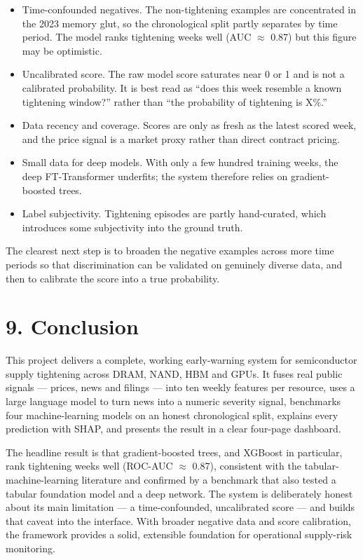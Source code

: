 \documentclass[11pt]{article}
\begin{document}
\begin{itemize}[topsep=4pt]
\item Time-confounded negatives. The non-tightening examples are concentrated in the 2023 memory glut, so the chronological split partly separates by time period. The model ranks tightening weeks well (AUC $\approx$ 0.87) but this figure may be optimistic.
\item Uncalibrated score. The raw model score saturates near 0 or 1 and is not a calibrated probability. It is best read as ``does this week resemble a known tightening window?'' rather than ``the probability of tightening is X\%.''
\item Data recency and coverage. Scores are only as fresh as the latest scored week, and the price signal is a market proxy rather than direct contract pricing.
\item Small data for deep models. With only a few hundred training weeks, the deep FT-Transformer underfits; the system therefore relies on gradient-boosted trees.
\item Label subjectivity. Tightening episodes are partly hand-curated, which introduces some subjectivity into the ground truth.
\end{itemize}

The clearest next step is to broaden the negative examples across more time periods so that discrimination can be validated on genuinely diverse data, and then to calibrate the score into a true probability.

\section{9. Conclusion}

This project delivers a complete, working early-warning system for semiconductor supply tightening across DRAM, NAND, HBM and GPUs. It fuses real public signals --- prices, news and filings --- into ten weekly features per resource, uses a large language model to turn news into a numeric severity signal, benchmarks four machine-learning models on an honest chronological split, explains every prediction with SHAP, and presents the result in a clear four-page dashboard.

The headline result is that gradient-boosted trees, and XGBoost in particular, rank tightening weeks well (ROC-AUC $\approx$ 0.87), consistent with the tabular-machine-learning literature and confirmed by a benchmark that also tested a tabular foundation model and a deep network. The system is deliberately honest about its main limitation --- a time-confounded, uncalibrated score --- and builds that caveat into the interface. With broader negative data and score calibration, the framework provides a solid, extensible foundation for operational supply-risk monitoring.
\end{document}
